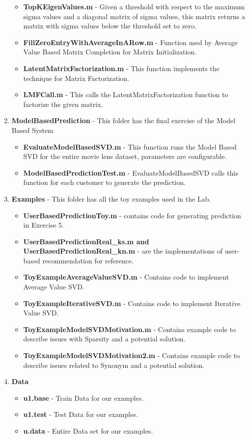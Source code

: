 \begin{enumerate}
\begin{itemize}
\item \textbf{TopKEigenValues.m} - Given a threshold with respect to the maximum sigma values and a diagonal matrix of sigma values, this matrix returns a matrix with sigma values below the threshold set to zero.
\item \textbf{FillZeroEntryWithAverageInARow.m} - Function used by Average Value Based Matrix Completion for Matrix Initialization.
\item \textbf{LatentMatrixFactorization.m} - This function implements the technique for Matrix Factorization.
\item \textbf{LMFCall.m} - This calls the LatentMatrixFactorization function to factorize the given matrix.
\end{itemize}
\item \textbf{ModelBasedPrediction} - This folder has the final exercise of the Model Based System
\begin{itemize}
\item \textbf{EvaluateModelBasedSVD.m} - This function runs the Model Based SVD for the entire movie lens dataset, parameters are configurable.
\item \textbf{ModelBasedPredictionTest.m} - EvaluateModelBasedSVD calls this function for each customer to generate the prediction.
\end{itemize}
\item \textbf{Examples} - This folder has all the toy examples used in the Lab.
\begin{itemize}
\item \textbf{UserBasedPredictionToy.m} - contains code for generating prediction in Exercise 5.
\item \textbf{UserBasedPredictionReal\_ks.m and UserBasedPredictionReal\_kn.m} - are the implementations of user-based recommendation for reference.
\item \textbf{ToyExampleAverageValueSVD.m} - Contains code to implement Average Value SVD.
\item \textbf{ToyExampleIterativeSVD.m} - Contains code to implement Iterative Value SVD.
\item \textbf{ToyExampleModelSVDMotivation.m} - Contains example code to describe issues with Sparsity and a potential solution.
\item \textbf{ToyExampleModelSVDMotivation2.m} - Contains example code to describe issues related to Synonym and a potential solution.
\end{itemize}
\item \textbf{Data}
\begin{itemize}
\item \textbf{u1.base} - Train Data for our examples.
\item \textbf{u1.test} - Test Data for our examples.
\item \textbf{u.data} - Entire Data set for our examples.
\end{itemize}
\end{enumerate}
